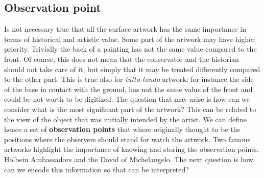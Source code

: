 \subsection{Observation point}
Is not necessary true that all the surface artwork has the same importance in terms of historical and artistic value. Some part of the artwork may have higher priority. Trivially the back of a painting has not the same value compared to the front. Of course, this does not mean that the conservator and the historian should not take care of it, but simply that it may be treated differently compared to the other part. This is true also for \textit{tutto-tondo} artwork: for instance the side of the base in contact with the ground, has not the same value of the front and could be not worth to be digitized. The question that may arise is how can we consider what is the most significant part of the artwork?  This can be related to the view of the object that was initially intended by the artist. We can define hence a set of \textbf{observation points} that where originally   thought to be the positions where the observers should stand for watch the artwork. Two famous artworks highlight the importance of knowing and storing the observation points. Holbein Ambassadors and the David of Michelangelo.
The next question is how can we encode this information so that can be interpreted?